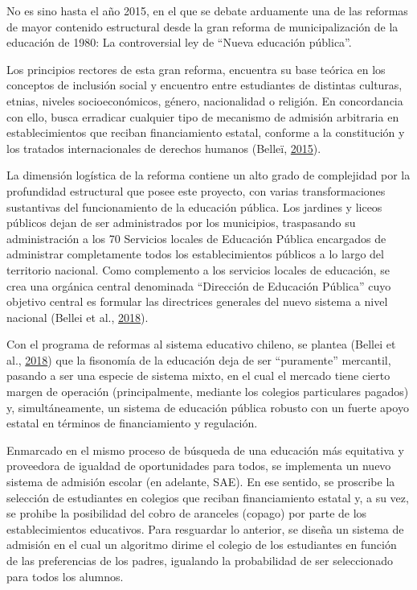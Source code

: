\documentclass[
]{article}
\begin{document}
No es sino hasta el año 2015, en el que se debate arduamente una de las
reformas de mayor contenido estructural desde la gran reforma de
municipalización de la educación de 1980: La controversial ley de
``Nueva educación pública''.

Los principios rectores de esta gran reforma, encuentra su base teórica
en los conceptos de inclusión social y encuentro entre estudiantes de
distintas culturas, etnias, niveles socioeconómicos, género,
nacionalidad o religión. En concordancia con ello, busca erradicar
cualquier tipo de mecanismo de admisión arbitraria en establecimientos
que reciban financiamiento estatal, conforme a la constitución y los
tratados internacionales de derechos humanos (Belleï,
\protect\hyperlink{ref-bellei_gran_2015}{2015}).

La dimensión logística de la reforma contiene un alto grado de
complejidad por la profundidad estructural que posee este proyecto, con
varias transformaciones sustantivas del funcionamiento de la educación
pública. Los jardines y liceos públicos dejan de ser administrados por
los municipios, traspasando su administración a los 70 Servicios locales
de Educación Pública encargados de administrar completamente todos los
establecimientos públicos a lo largo del territorio nacional. Como
complemento a los servicios locales de educación, se crea una orgánica
central denominada ``Dirección de Educación Pública'' cuyo objetivo
central es formular las directrices generales del nuevo sistema a nivel
nacional (Bellei et al.,
\protect\hyperlink{ref-bellei_nueva_2018}{2018}).

Con el programa de reformas al sistema educativo chileno, se plantea
(Bellei et al., \protect\hyperlink{ref-bellei_nueva_2018}{2018}) que la
fisonomía de la educación deja de ser ``puramente'' mercantil, pasando a
ser una especie de sistema mixto, en el cual el mercado tiene cierto
margen de operación (principalmente, mediante los colegios particulares
pagados) y, simultáneamente, un sistema de educación pública robusto con
un fuerte apoyo estatal en términos de financiamiento y regulación.

Enmarcado en el mismo proceso de búsqueda de una educación más
equitativa y proveedora de igualdad de oportunidades para todos, se
implementa un nuevo sistema de admisión escolar (en adelante, SAE). En
ese sentido, se proscribe la selección de estudiantes en colegios que
reciban financiamiento estatal y, a su vez, se prohibe la posibilidad
del cobro de aranceles (copago) por parte de los establecimientos
educativos. Para resguardar lo anterior, se diseña un sistema de
admisión en el cual un algoritmo dirime el colegio de los estudiantes en
función de las preferencias de los padres, igualando la probabilidad de
ser seleccionado para todos los alumnos.
\end{document}

